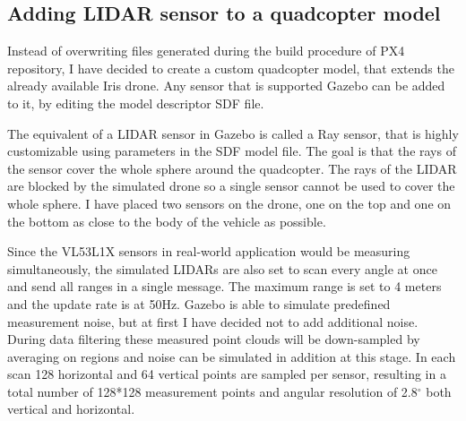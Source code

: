 \subsection{Adding LIDAR sensor to a quadcopter model}
Instead of overwriting files generated during the build procedure of PX4 repository, I have decided to 
create a custom quadcopter model, that extends the already available Iris drone. Any sensor that is 
supported Gazebo can be added to it, by editing the model descriptor SDF file. 

The equivalent of a LIDAR sensor in Gazebo is called a Ray sensor, that is highly customizable using
parameters in the SDF model file. The goal is that the rays of the sensor cover the whole sphere around 
the quadcopter. The rays of the LIDAR are blocked by the simulated drone so a single sensor
cannot be used to cover the whole sphere. 
I have placed two sensors on the drone, one on the top and one on the bottom as close to the body
of the vehicle as possible. 

Since the VL53L1X sensors in real-world application would be measuring simultaneously, the simulated 
LIDARs are also set to scan every angle at once and send all ranges in a single message. The maximum 
range is set to 4 meters and the update rate is at 50Hz. Gazebo is able to simulate predefined measurement
noise, but at first I have decided not to add additional noise. During data filtering these measured 
point clouds will be down-sampled by averaging on regions and noise can be simulated in addition at 
this stage. In each scan 128 horizontal and 64 vertical points are sampled per sensor, resulting in 
a total number of 128*128 measurement points and angular resolution of 2.8$^{\circ}$ both vertical 
and horizontal.

